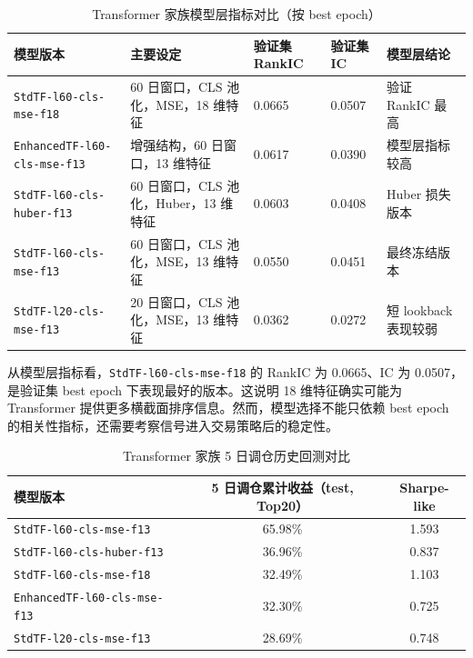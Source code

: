 \documentclass[12pt,a4paper,cn,bibtex]{elegantpaper}
\newcommand{\modelname}[1]{\nolinkurl{#1}}
\begin{document}
\begin{table}[H]
    \centering
    \small
    \begin{tabularx}{\textwidth}{lXXXX}
        \toprule
        \textbf{模型版本} & \textbf{主要设定} & \textbf{验证集 RankIC} & \textbf{验证集 IC} & \textbf{模型层结论} \\
        \midrule
        \modelname{StdTF-l60-cls-mse-f18} & 60 日窗口，CLS 池化，MSE，18 维特征 & 0.0665 & 0.0507 & 验证 RankIC 最高 \\
        \modelname{EnhancedTF-l60-cls-mse-f13} & 增强结构，60 日窗口，13 维特征 & 0.0617 & 0.0390 & 模型层指标较高 \\
        \modelname{StdTF-l60-cls-huber-f13} & 60 日窗口，CLS 池化，Huber，13 维特征 & 0.0603 & 0.0408 & Huber 损失版本 \\
        \modelname{StdTF-l60-cls-mse-f13} & 60 日窗口，CLS 池化，MSE，13 维特征 & 0.0550 & 0.0451 & 最终冻结版本 \\
        \modelname{StdTF-l20-cls-mse-f13} & 20 日窗口，CLS 池化，MSE，13 维特征 & 0.0362 & 0.0272 & 短 lookback 表现较弱 \\
        \bottomrule
    \end{tabularx}
    \caption{Transformer 家族模型层指标对比（按 best epoch）}
    \label{tab:tf-model-metric}
\end{table}

从模型层指标看，\modelname{StdTF-l60-cls-mse-f18} 的 RankIC 为 0.0665、IC 为 0.0507，是验证集 best epoch 下表现最好的版本。这说明 18 维特征确实可能为 Transformer 提供更多横截面排序信息。然而，模型选择不能只依赖 best epoch 的相关性指标，还需要考察信号进入交易策略后的稳定性。

\begin{table}[H]
    \centering
    \small
    \begin{tabular}{lcc}
        \toprule
        \textbf{模型版本} & \textbf{5 日调仓累计收益（test, Top20）} & \textbf{Sharpe-like} \\
        \midrule
        \modelname{StdTF-l60-cls-mse-f13} & 65.98\% & 1.593 \\
        \modelname{StdTF-l60-cls-huber-f13} & 36.96\% & 0.837 \\
        \modelname{StdTF-l60-cls-mse-f18} & 32.49\% & 1.103 \\
        \modelname{EnhancedTF-l60-cls-mse-f13} & 32.30\% & 0.725 \\
        \modelname{StdTF-l20-cls-mse-f13} & 28.69\% & 0.748 \\
        \bottomrule
    \end{tabular}
    \caption{Transformer 家族 5 日调仓历史回测对比}
    \label{tab:tf-backtest}
\end{table}
\end{document}
